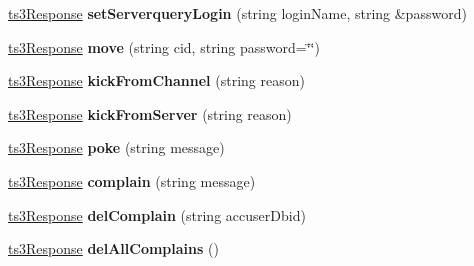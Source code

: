 \begin{DoxyCompactItemize}
\item 
\hyperlink{struct_ts3_api_1_1ts3_response}{ts3\+Response} {\bfseries set\+Serverquery\+Login} (string login\+Name, string \&password)\hypertarget{class_ts3_api_1_1_client_a277e3458db8f632503f42b3d11d7bf28}{}\label{class_ts3_api_1_1_client_a277e3458db8f632503f42b3d11d7bf28}

\item 
\hyperlink{struct_ts3_api_1_1ts3_response}{ts3\+Response} {\bfseries move} (string cid, string password=\char`\"{}\char`\"{})\hypertarget{class_ts3_api_1_1_client_a1673758a952af1d35e8e7cd1ee2797e7}{}\label{class_ts3_api_1_1_client_a1673758a952af1d35e8e7cd1ee2797e7}

\item 
\hyperlink{struct_ts3_api_1_1ts3_response}{ts3\+Response} {\bfseries kick\+From\+Channel} (string reason)\hypertarget{class_ts3_api_1_1_client_ab381622a51f6ae97b1e137bf7ac6a409}{}\label{class_ts3_api_1_1_client_ab381622a51f6ae97b1e137bf7ac6a409}

\item 
\hyperlink{struct_ts3_api_1_1ts3_response}{ts3\+Response} {\bfseries kick\+From\+Server} (string reason)\hypertarget{class_ts3_api_1_1_client_a6e8af904443616a105b1175bf75af0ac}{}\label{class_ts3_api_1_1_client_a6e8af904443616a105b1175bf75af0ac}

\item 
\hyperlink{struct_ts3_api_1_1ts3_response}{ts3\+Response} {\bfseries poke} (string message)\hypertarget{class_ts3_api_1_1_client_ace50488f45a5a3c823d81cad5b472c36}{}\label{class_ts3_api_1_1_client_ace50488f45a5a3c823d81cad5b472c36}

\item 
\hyperlink{struct_ts3_api_1_1ts3_response}{ts3\+Response} {\bfseries complain} (string message)\hypertarget{class_ts3_api_1_1_client_aa906a4990ae4782977fe57a2ac769afa}{}\label{class_ts3_api_1_1_client_aa906a4990ae4782977fe57a2ac769afa}

\item 
\hyperlink{struct_ts3_api_1_1ts3_response}{ts3\+Response} {\bfseries del\+Complain} (string accuser\+Dbid)\hypertarget{class_ts3_api_1_1_client_a99223aa38b6c0ef75539c701b6a62d88}{}\label{class_ts3_api_1_1_client_a99223aa38b6c0ef75539c701b6a62d88}

\item 
\hyperlink{struct_ts3_api_1_1ts3_response}{ts3\+Response} {\bfseries del\+All\+Complains} ()\hypertarget{class_ts3_api_1_1_client_ac068b0295c2f83931cfc353cc42236ec}{}\label{class_ts3_api_1_1_client_ac068b0295c2f83931cfc353cc42236ec}


\end{DoxyCompactItemize}

